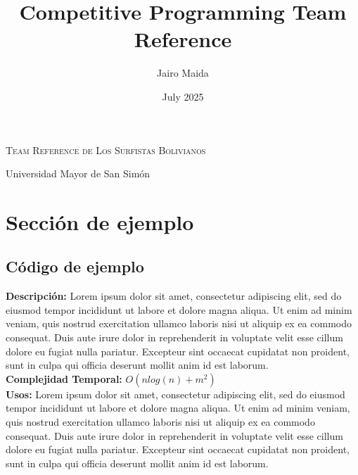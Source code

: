 \documentclass{article}
\title{Competitive Programming Team Reference}
\author{Jairo Maida}
\date{July 2025}
\newcommand{\includecpp}[6]{%
		\subsection{#1}
		\textbf{Descripción:} #2\\
		\textbf{Complejidad Temporal:} #3\\	
		\textbf{Usos: } #4	
		
}
\begin{document}
	\begin{center}
		\Huge\textsc{Team Reference de Los Surfistas Bolivianos}
		
		\vspace{0.35cm}
		
		\huge Universidad Mayor de San Simón
		
		\vspace{0.35cm}
		
	\end{center}

	
	\begin{multicols}{2}
		\tableofcontents
	\end{multicols}
	
	\pagebreak
	
	\section{Sección de ejemplo}
		\begin{multicols*}{2}
			\includecpp{Código de ejemplo}
			{Lorem ipsum dolor sit amet, consectetur adipiscing elit, sed do eiusmod tempor incididunt ut labore et dolore magna aliqua. Ut enim ad minim veniam, quis nostrud exercitation ullamco laboris nisi ut aliquip ex ea commodo consequat. Duis aute irure dolor in reprehenderit in voluptate velit esse cillum dolore eu fugiat nulla pariatur. Excepteur sint occaecat cupidatat non proident, sunt in culpa qui officia deserunt mollit anim id est laborum.}
			{$O(nlog(n) + m^{2})$}
			{Lorem ipsum dolor sit amet, consectetur adipiscing elit, sed do eiusmod tempor incididunt ut labore et dolore magna aliqua. Ut enim ad minim veniam, quis nostrud exercitation ullamco laboris nisi ut aliquip ex ea commodo consequat. Duis aute irure dolor in reprehenderit in voluptate velit esse cillum dolore eu fugiat nulla pariatur. Excepteur sint occaecat cupidatat non proident, sunt in culpa qui officia deserunt mollit anim id est laborum.}
			{.}
			{example_code.cpp}
			
		\end{multicols*}
	
	
\end{document}
